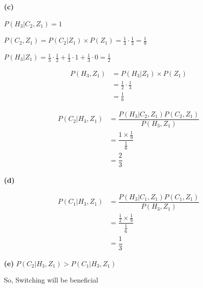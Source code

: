 \documentclass{article}
\theoremstyle{remark}
\begin{document}
\hspace{2.5em} \textbf{(c)}
\begin {center}
$P(H_3|C_2, Z_1)=1 $ \par
$ P(C_2,Z_1)=P(C_2|Z_1) \times P(Z_1)=\frac{1}{3} \cdot \frac{1}{3}=\frac{1}{9}$\par
$ P(H_3|Z_1)= \frac{1}{3}\cdot\frac{1}{2}+\frac{1}{3}\cdot1+\frac{1}{3}\cdot0=\frac{1}{2} $ \par
\begin {align*}
P(H_3,Z_1) &= P(H_3|Z_1) \times P(Z_1) \\
&=\frac{1}{2} \cdot \frac{1}{3}\\
&= \frac{1}{6}
\end {align*}

\begin{align*}
    P(C_2|H_3,Z_1) & = \dfrac{P(H_3|C_2,Z_1)P(C_2,Z_1)}{P(H_3,Z_1)} \\
                   & = \dfrac{1 \times \frac{1}{9}}{\frac{1}{6}}    \\
                   & = \dfrac{2}{3}
\end{align*}


\end {center}

\hspace{2.5em} \textbf{(d)}
\begin{center}
    \begin{align*}
        P(C_1|H_3,Z_1) & = \dfrac{P(H_3|C_1,Z_1)P(C_1,Z_1)}{P(H_3,Z_1)}       \\
                       & =\dfrac{\frac{1}{2} \times \frac{1}{9}}{\frac{1}{6}} \\
                       & = \dfrac{1}{3}
    \end{align*}



\end{center}


\hspace{2.5em} \textbf{(e)}
$P(C_2|H_3,Z_1) > P(C_1|H_3,Z_1)$ \par
\hspace{3.0em}So, Switching will be beneficial \par
\end{document}
